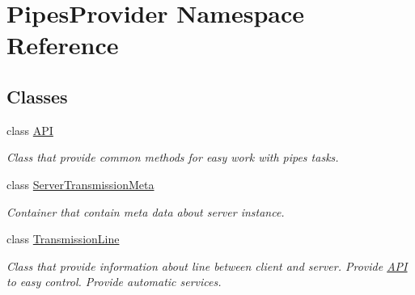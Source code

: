\hypertarget{namespace_pipes_provider}{}\section{Pipes\+Provider Namespace Reference}
\label{namespace_pipes_provider}
\subsection*{Classes}
\begin{DoxyCompactItemize}
\item 
class \mbox{\hyperlink{class_pipes_provider_1_1_a_p_i}{A\+PI}}
\begin{DoxyCompactList}\small\item\em Class that provide common methods for easy work with pipes\textquotesingle{} tasks. \end{DoxyCompactList}\item 
class \mbox{\hyperlink{class_pipes_provider_1_1_server_transmission_meta}{Server\+Transmission\+Meta}}
\begin{DoxyCompactList}\small\item\em Container that contain meta data about server instance. \end{DoxyCompactList}\item 
class \mbox{\hyperlink{class_pipes_provider_1_1_transmission_line}{Transmission\+Line}}
\begin{DoxyCompactList}\small\item\em Class that provide information about line between client and server. Provide \mbox{\hyperlink{class_pipes_provider_1_1_a_p_i}{A\+PI}} to easy control. Provide automatic services. \end{DoxyCompactList}\end{DoxyCompactItemize}
